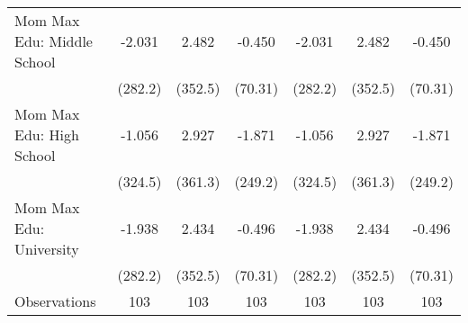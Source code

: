 {\begin{tabular}{l*{6}{c}}
\addlinespace
Mom Max Edu: Middle School&      -2.031         &       2.482         &      -0.450         &      -2.031         &       2.482         &      -0.450         \\
                    &     (282.2)         &     (352.5)         &     (70.31)         &     (282.2)         &     (352.5)         &     (70.31)         \\
\addlinespace
Mom Max Edu: High School&      -1.056         &       2.927         &      -1.871         &      -1.056         &       2.927         &      -1.871         \\
                    &     (324.5)         &     (361.3)         &     (249.2)         &     (324.5)         &     (361.3)         &     (249.2)         \\
\addlinespace
Mom Max Edu: University&      -1.938         &       2.434         &      -0.496         &      -1.938         &       2.434         &      -0.496         \\
                    &     (282.2)         &     (352.5)         &     (70.31)         &     (282.2)         &     (352.5)         &     (70.31)         \\
\midrule
Observations        &         103         &         103         &         103         &         103         &         103         &         103         \\
\bottomrule
\end{tabular}
}
